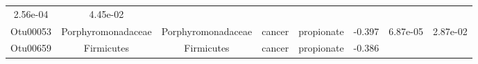 \documentclass[11pt,]{article}
\begin{document}
\begin{longtable}[]{@{}cccccccc@{}}
\begin{minipage}[t]{0.08\columnwidth}
2.56e-04\strut
\end{minipage} & \begin{minipage}[t]{0.08\columnwidth}\centering\strut
4.45e-02\strut
\end{minipage}\tabularnewline
\begin{minipage}[t]{0.08\columnwidth}\centering\strut
Otu00053\strut
\end{minipage} & \begin{minipage}[t]{0.15\columnwidth}\centering\strut
Porphyromonadaceae\strut
\end{minipage} & \begin{minipage}[t]{0.15\columnwidth}\centering\strut
Porphyromonadaceae\strut
\end{minipage} & \begin{minipage}[t]{0.08\columnwidth}\centering\strut
cancer\strut
\end{minipage} & \begin{minipage}[t]{0.09\columnwidth}\centering\strut
propionate\strut
\end{minipage} & \begin{minipage}[t]{0.07\columnwidth}\centering\strut
-0.397\strut
\end{minipage} & \begin{minipage}[t]{0.08\columnwidth}\centering\strut
6.87e-05\strut
\end{minipage} & \begin{minipage}[t]{0.08\columnwidth}\centering\strut
2.87e-02\strut
\end{minipage}\tabularnewline
\begin{minipage}[t]{0.08\columnwidth}\centering\strut
Otu00659\strut
\end{minipage} & \begin{minipage}[t]{0.15\columnwidth}\centering\strut
Firmicutes\strut
\end{minipage} & \begin{minipage}[t]{0.15\columnwidth}\centering\strut
Firmicutes\strut
\end{minipage} & \begin{minipage}[t]{0.08\columnwidth}\centering\strut
cancer\strut
\end{minipage} & \begin{minipage}[t]{0.09\columnwidth}\centering\strut
propionate\strut
\end{minipage} & \begin{minipage}[t]{0.07\columnwidth}\centering\strut
-0.386\strut
\end{minipage} & \begin{minipage}[t]{0.08\columnwidth}\centering\strut

\end{minipage}
\end{longtable}
\end{document}
